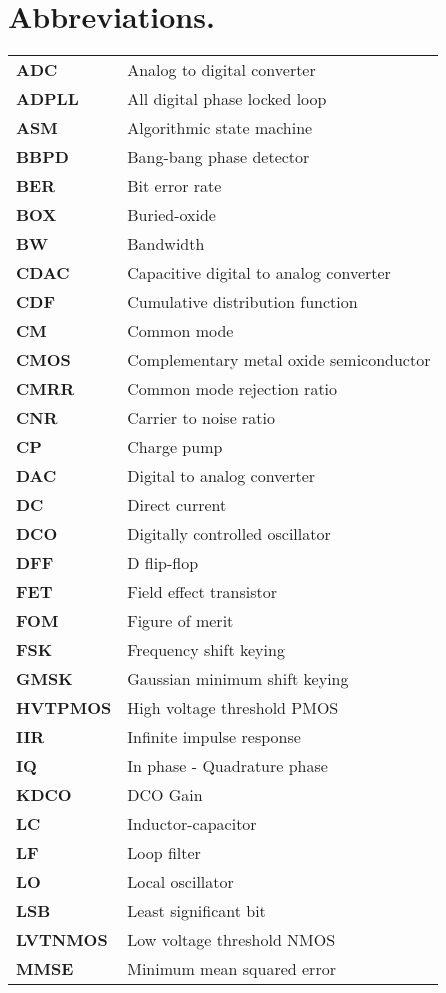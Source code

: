 \section*{Abbreviations.}
	{\renewcommand*{\arraystretch}{1.10}\large
	\begin{tabular}{@{}ll}
		\textbf{\textsf{ADC}}	&	Analog to digital converter \\
		\textbf{\textsf{ADPLL}}	&	All digital phase locked loop \\
		\textbf{\textsf{ASM}}	&	Algorithmic state machine \\
		\textbf{\textsf{BBPD}}	&	Bang-bang phase detector \\
		\textbf{\textsf{BER}}	&	Bit error rate \\
		\textbf{\textsf{BOX}}	&	Buried-oxide \\
		\textbf{\textsf{BW}}	&	Bandwidth \\
		\textbf{\textsf{CDAC}}	&	Capacitive digital to analog converter \\
		\textbf{\textsf{CDF}}	&	Cumulative distribution function \\
		\textbf{\textsf{CM}}	&	Common mode \\
		\textbf{\textsf{CMOS}}	&	Complementary metal oxide semiconductor \\
		\textbf{\textsf{CMRR}}	&	Common mode rejection ratio \\
		\textbf{\textsf{CNR}}	&	Carrier to noise ratio \\
		\textbf{\textsf{CP}}	&	Charge pump \\
		\textbf{\textsf{DAC}}	&	Digital to analog converter \\
		\textbf{\textsf{DC}}	&	Direct current \\
		\textbf{\textsf{DCO}}	&	Digitally controlled oscillator \\
		\textbf{\textsf{DFF}}	&	D flip-flop \\
		\textbf{\textsf{FET}}	&	Field effect transistor \\
		\textbf{\textsf{FOM}}	&	Figure of merit \\
		\textbf{\textsf{FSK}}	&	Frequency shift keying \\
		\textbf{\textsf{GMSK}}	&	Gaussian minimum shift keying \\
		\textbf{\textsf{HVTPMOS}}	&	High voltage threshold PMOS \\
		\textbf{\textsf{IIR}}	&	Infinite impulse response \\
		\textbf{\textsf{IQ}}	&	In phase - Quadrature phase \\
		\textbf{\textsf{KDCO}}	&	DCO Gain \\
		\textbf{\textsf{LC}}	&	Inductor-capacitor \\
		\textbf{\textsf{LF}}	&	Loop filter \\
		\textbf{\textsf{LO}}	&	Local oscillator \\
		\textbf{\textsf{LSB}}	&	Least significant bit \\
		\textbf{\textsf{LVTNMOS}}	&	Low voltage threshold NMOS \\
		\textbf{\textsf{MMSE}}	&	Minimum mean squared error \\
	\end{tabular}}
